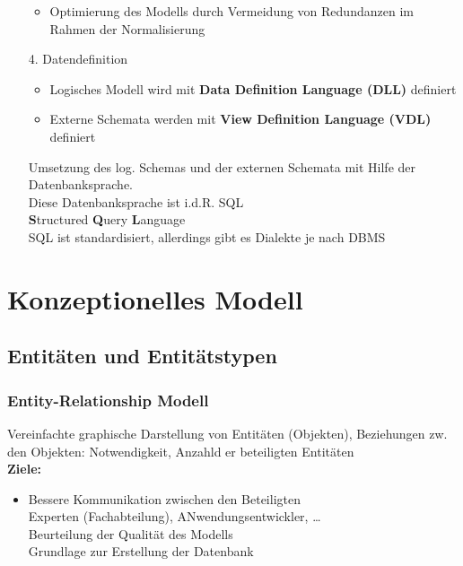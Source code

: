 \documentclass{scrreprt}
\newcommand\tab[1][1cm]{\hspace*{#1}}
\begin{document}
\begin{itemize}
\begin{itemize}
    \item Optimierung des Modells durch Vermeidung von Redundanzen im Rahmen der Normalisierung
  \end{itemize}
  \item [4.] Datendefinition
  \begin{itemize}
    \item Logisches Modell wird mit \textbf{Data Definition Language (DLL)} definiert
    \item Externe Schemata werden mit \textbf{View Definition Language (VDL)} definiert
  \end{itemize}
    Umsetzung des log. Schemas und der externen Schemata mit Hilfe der Datenbanksprache.
  \\Diese Datenbanksprache ist i.d.R. SQL
  \\\textbf{S}tructured \textbf{Q}uery \textbf{L}anguage
  \\SQL ist standardisiert, allerdings gibt es Dialekte je nach DBMS

\end{itemize}
\chapter{Konzeptionelles Modell}
\section{Entitäten und Entitätstypen}
\subsection{Entity-Relationship Modell}
Vereinfachte graphische Darstellung von Entitäten (Objekten), Beziehungen zw. den Objekten: Notwendigkeit, Anzahld er beteiligten Entitäten
\\\textbf{Ziele:}
\begin{itemize}
  \item Bessere Kommunikation zwischen den Beteiligten
  \\\tab Experten (Fachabteilung), ANwendungsentwickler, \dots
  \\\tab Beurteilung der Qualität des Modells
  \\\tab Grundlage zur Erstellung der Datenbank
\end{itemize}
\end{document}
